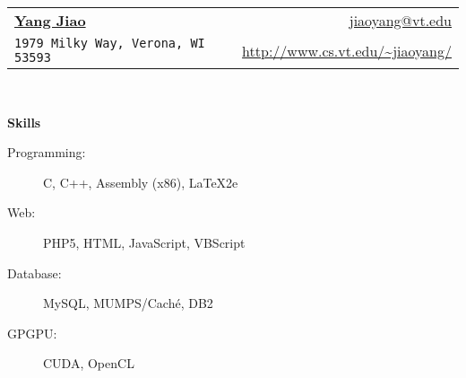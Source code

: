 \documentclass[letterpaper,11pt]{article}
\newcommand{\resheading}[1]{{\large \colorbox{mygrey}{\begin{minipage}{\textwidth}{\textbf{#1 \vphantom{p\^{E}}}}\end{minipage}}}}
\begin{document}
\newcommand{\mywebheader}{
\begin{tabular*}{7in}{l@{\extracolsep{\fill}}r}
	\textbf{\href{http://www.cs.vt.edu/~jiaoyang/}{\LARGE Yang Jiao}}
	& \href{mailto:jiaoyang@vt.edu}{\url{jiaoyang@vt.edu}}\\
	{\footnotesize \texttt{1979 Milky Way, Verona, WI 53593}} &
	\href{http://www.cs.vt.edu/\%7ejiaoyang/}{\url{http://www.cs.vt.edu/~jiaoyang/}}
	\\
	\end{tabular*}
\\
\vspace{0.1in}}

\mywebheader

\resheading{Skills}
	\begin{description}
		\item[Programming:] { \footnotesize C, C++, Assembly (x86),
		\LaTeX2e}
		\item[Web:] { \footnotesize PHP5, HTML, JavaScript, VBScript}
		\item[Database:]{ \footnotesize MySQL, MUMPS/Cach\'e, DB2} 
		\item[GPGPU:]{ \footnotesize CUDA, OpenCL} 
	\end{description} %
\end{document}
